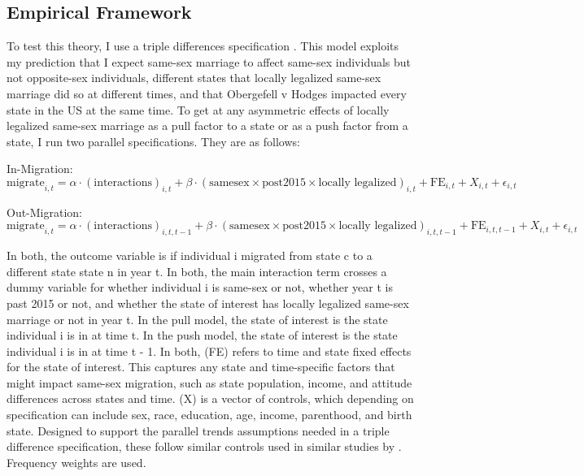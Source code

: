 \documentclass[12pt,letterpaper]{article}
\begin{document}
\subsection{Empirical Framework}

To test this theory, I use a triple differences specification \citep{23, 24, 25}. This model exploits my prediction that I expect same-sex marriage to affect same-sex individuals but not opposite-sex individuals, different states that locally legalized same-sex marriage did so at different times, and that Obergefell v Hodges impacted every state in the US at the same time. To get at any asymmetric effects of locally legalized same-sex marriage as a pull factor to a state or as a push factor from a state, I run two parallel specifications. They are as follows:

In-Migration:
\begin{equation}
\text{migrate}_{i,t} = \alpha \cdot (\text{interactions})_{i,t} 
+ \beta \cdot (\text{samesex} \times \text{post2015} \times \text{locally legalized})_{i,t} 
+ \text{FE}_{i,t} + X_{i,t} + \epsilon_{i,t}
\end{equation}

Out-Migration:
\begin{equation}
\text{migrate}_{i,t} = 
\alpha \cdot (\text{interactions})_{i,t,t-1} + \beta \cdot (\text{samesex} \times \text{post2015} \times \text{locally legalized})_{i,t,t-1} + \text{FE}_{i,t,t-1} + X_{i,t} + \epsilon_{i,t}
\end{equation}

In both, the outcome variable is if individual i migrated from state c to a different state state n in year t. In both, the main interaction term crosses a dummy variable for whether individual i is same-sex or not, whether year t is past 2015 or not, and whether the state of interest has locally legalized same-sex marriage or not in year t. In the pull model, the state of interest is the state individual i is in at time t. In the push model, the state of interest is the state individual i is in at time t - 1. In both, (FE) refers to time and state fixed effects for the state of interest. This captures any state and time-specific factors that might impact same-sex migration, such as state population, income, and attitude differences across states and time. (X) is a vector of controls, which depending on specification can include sex, race, education, age, income, parenthood, and birth state. Designed to support the parallel trends assumptions needed in a triple difference specification, these follow similar controls used in similar studies by \citep{1, 3, 5, 7, 12}. Frequency weights are used.
\end{document}

